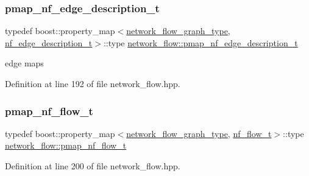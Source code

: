 \subsubsection{\texorpdfstring{pmap\+\_\+nf\+\_\+edge\+\_\+description\+\_\+t}{pmap\_nf\_edge\_description\_t}}
{\footnotesize\ttfamily typedef boost\+::property\+\_\+map$<$\hyperlink{classnetwork__flow_abfdb8d1baba183c2b121f8c078b9b640}{network\+\_\+flow\+\_\+graph\+\_\+type}, \hyperlink{structnetwork__flow_1_1nf__edge__description__t}{nf\+\_\+edge\+\_\+description\+\_\+t}$>$\+::type \hyperlink{classnetwork__flow_a1ea6b2ccbcafb4ecd4d6fb0e64b53350}{network\+\_\+flow\+::pmap\+\_\+nf\+\_\+edge\+\_\+description\+\_\+t}\hspace{0.3cm}{\ttfamily [private]}}



edge maps 



Definition at line 192 of file network\+\_\+flow.\+hpp.

\mbox{\label{classnetwork__flow_ab39a2916cb880c6ee352ff76b2378514}} 
\subsubsection{\texorpdfstring{pmap\+\_\+nf\+\_\+flow\+\_\+t}{pmap\_nf\_flow\_t}}
{\footnotesize\ttfamily typedef boost\+::property\+\_\+map$<$\hyperlink{classnetwork__flow_abfdb8d1baba183c2b121f8c078b9b640}{network\+\_\+flow\+\_\+graph\+\_\+type}, \hyperlink{structnetwork__flow_1_1nf__flow__t}{nf\+\_\+flow\+\_\+t}$>$\+::type \hyperlink{classnetwork__flow_ab39a2916cb880c6ee352ff76b2378514}{network\+\_\+flow\+::pmap\+\_\+nf\+\_\+flow\+\_\+t}\hspace{0.3cm}{\ttfamily [private]}}



Definition at line 200 of file network\+\_\+flow.\+hpp.

\mbox{\label{classnetwork__flow_a5760a4393bb7caf9af993443e209de05}} 
